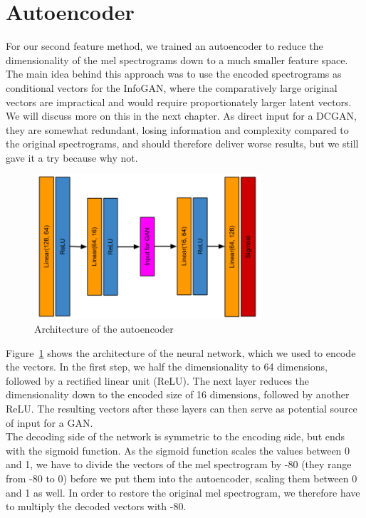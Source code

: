 \section{Autoencoder}
    For our second feature method, we trained an autoencoder to reduce the dimensionality of the mel spectrograms down to a much smaller feature space.
    The main idea behind this approach was to use the encoded spectrograms as conditional vectors for the InfoGAN, where the comparatively large original vectors are impractical and would require proportionately larger latent vectors.
    We will discuss more on this in the next chapter.
    As direct input for a DCGAN, they are somewhat redundant, losing information and complexity compared to the original spectrograms, and should therefore deliver worse results, but we still gave it a try because why not.\\
    \begin{figure}[!t]
        \centering
        \includegraphics[width=0.75\textwidth]{images/autoencoder}    
        \caption{Architecture of the autoencoder}
        \label{autoencoder}
    \end{figure}
    \indent Figure~\ref{autoencoder} shows the architecture of the neural network, which we used to encode the vectors. In the first step, we half the dimensionality to 64 dimensions, followed by a rectified linear unit (ReLU).
    The next layer reduces the dimensionality down to the encoded size of 16 dimensions, followed by another ReLU. 
    The resulting vectors after these layers can then serve as potential source of input for a GAN.\\
    \indent The decoding side of the network is symmetric to the encoding side, but ends with the sigmoid function. As the sigmoid function scales the values between 0 and 1, we have to divide the vectors of the mel spectrogram by -80 (they range from -80 to 0) before we put them into the autoencoder, scaling them between 0 and 1 as well. In order to restore the original mel spectrogram, we therefore have to multiply the decoded vectors with -80.\\
